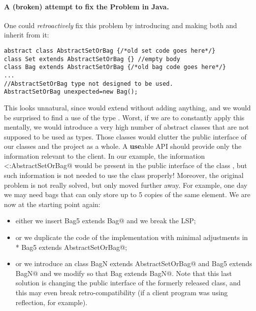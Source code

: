 \paragraph{A (broken) attempt to fix the Problem in Java.}
One could \emph{retroactively} fix this problem by introducing \Q@AbstractSetOrBag@
and making both \Q@Bag@ and \Q@Set@ inherit from it:
\saveSpace\saveSpace
\begin{lstlisting}
abstract class AbstractSetOrBag {/*old set code goes here*/}
class Set extends AbstractSetOrBag {} //empty body
class Bag extends AbstractSetOrBag {/*old bag code goes here*/}
...
//AbstractSetOrBag type not designed to be used.
AbstractSetOrBag unexpected=new Bag(); 
\end{lstlisting}
\saveSpace\saveSpace
This looks unnatural, since \Q@Set@ would extend \Q@AbstractSetOrBag@ without adding anything,
and we would be surprised to find a use of the type \Q@AbstractSetOrBag@.
Worst, if we are to constantly apply this mentally, we would introduce a very high number
of abstract classes that are not supposed to be used as types. Those classes would clutter the 
public interface of our classes and the project as a whole.
A \textbf{use}able API should provide only the information relevant to the client.
In our example, the information \Q@Set<:AbstractSetOrBag@ would be present in the public interface
of the class \Q@Set@, but such information is not needed to use the class properly!
Moreover, the original problem is not really solved, but only moved 
further away. For example, one day  we may need bags that can only store up to 5 copies of the same element.
We are now at the starting point again:
\begin{itemize}
\item either we insert \Q@class Bag5 extends Bag@ and we break the LSP; 
\item or we duplicate the code of the \Q@Bag@ implementation with minimal
  adjustments in \\* \Q@class Bag5 extends AbstractSetOrBag@;
\item or we introduce an
\Q@abstract class BagN extends AbstractSetOrBag@ and \Q@class Bag5 extends BagN@
and we modify \Q@Bag@ so that  \Q@class Bag extends BagN@.
Note that this last solution is changing the public interface of the formerly released \Q@Bag@ class, and
this may even break retro-compatibility (if a client program was using
reflection, for example).
\end{itemize}

